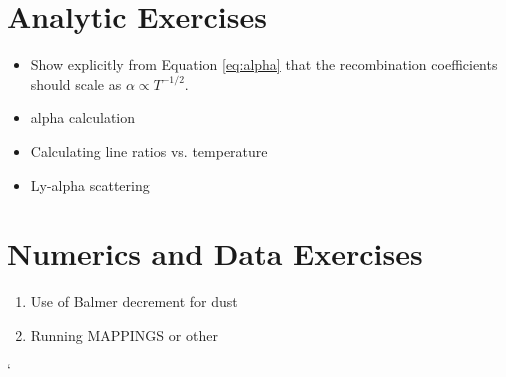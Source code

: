 \section{Analytic Exercises}

\begin{itemize}
\item Show explicitly from Equation \ref{eq:alpha} that the
recombination coefficients should scale
as $\alpha\propto T^{-1/2}$.
\item alpha calculation
\item Calculating line ratios vs. temperature
\item Ly-alpha scattering
\end{itemize}

\section{Numerics and Data Exercises}

\begin{enumerate}
\item Use of Balmer decrement for dust
\item Running MAPPINGS or other
\end{enumerate}`


  
